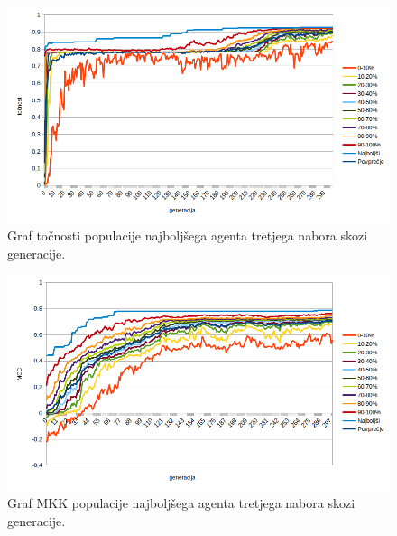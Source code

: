 \begin{figure}[H]
    \begin{center}
        \includegraphics[width=13cm]{shuttle/3/acc}
    \end{center}
    \caption{Graf točnosti populacije najboljšega agenta tretjega nabora skozi generacije.}
    \label{fig:statlog_acc_3}
\end{figure}

\begin{figure}[H]
    \begin{center}
        \includegraphics[width=13cm]{shuttle/3/mcc}
    \end{center}
    \caption{Graf MKK populacije najboljšega agenta tretjega nabora skozi generacije.}
    \label{fig:statlog_mcc_3}
\end{figure}

